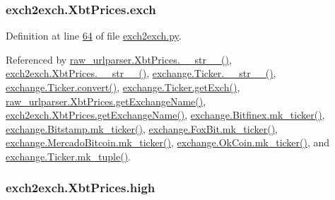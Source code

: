 \subsubsection[{\texorpdfstring{exch}{exch}}]{\setlength{\rightskip}{0pt plus 5cm}exch2exch.\+Xbt\+Prices.\+exch}\hypertarget{classexch2exch_1_1_xbt_prices_a72caf3a29017a1ceaf4367240a46b360}{}\label{classexch2exch_1_1_xbt_prices_a72caf3a29017a1ceaf4367240a46b360}


Definition at line \hyperlink{exch2exch_8py_source_l00064}{64} of file \hyperlink{exch2exch_8py_source}{exch2exch.\+py}.



Referenced by \hyperlink{raw__urlparser_8py_source_l00074}{raw\+\_\+urlparser.\+Xbt\+Prices.\+\_\+\+\_\+str\+\_\+\+\_\+()}, \hyperlink{exch2exch_8py_source_l00091}{exch2exch.\+Xbt\+Prices.\+\_\+\+\_\+str\+\_\+\+\_\+()}, \hyperlink{exchange_8py_source_l00111}{exchange.\+Ticker.\+\_\+\+\_\+str\+\_\+\+\_\+()}, \hyperlink{exchange_8py_source_l00065}{exchange.\+Ticker.\+convert()}, \hyperlink{exchange_8py_source_l00087}{exchange.\+Ticker.\+get\+Exch()}, \hyperlink{raw__urlparser_8py_source_l00068}{raw\+\_\+urlparser.\+Xbt\+Prices.\+get\+Exchange\+Name()}, \hyperlink{exch2exch_8py_source_l00085}{exch2exch.\+Xbt\+Prices.\+get\+Exchange\+Name()}, \hyperlink{exchange_8py_source_l00354}{exchange.\+Bitfinex.\+mk\+\_\+ticker()}, \hyperlink{exchange_8py_source_l00423}{exchange.\+Bitstamp.\+mk\+\_\+ticker()}, \hyperlink{exchange_8py_source_l00482}{exchange.\+Fox\+Bit.\+mk\+\_\+ticker()}, \hyperlink{exchange_8py_source_l00557}{exchange.\+Mercado\+Bitcoin.\+mk\+\_\+ticker()}, \hyperlink{exchange_8py_source_l00622}{exchange.\+Ok\+Coin.\+mk\+\_\+ticker()}, and \hyperlink{exchange_8py_source_l00096}{exchange.\+Ticker.\+mk\+\_\+tuple()}.

\subsubsection[{\texorpdfstring{high}{high}}]{\setlength{\rightskip}{0pt plus 5cm}exch2exch.\+Xbt\+Prices.\+high}\hypertarget{classexch2exch_1_1_xbt_prices_aeae6235417d65d9e9c768a51c38d5388}{}\label{classexch2exch_1_1_xbt_prices_aeae6235417d65d9e9c768a51c38d5388}


